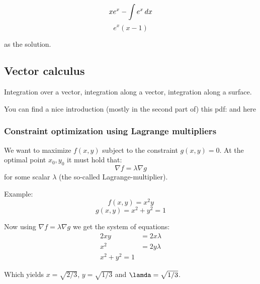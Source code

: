 $$ xe^x - \int e^x \mathop{dx} $$
$$ e^x ( x - 1) $$

as the solution. 

\subsection{Vector calculus}

Integration over a vector, integration along a vector, integration along a surface. 

You can find a nice introduction (mostly in the second part of) this pdf:  and here 


\subsubsection{Constraint optimization using Lagrange multipliers}

We want to maximize $f(x, y)$ subject to the constraint $g(x, y) = 0$.
At the optimal point $x_0, y_0$ it must hold that:
\begin{equation}
  \nabla f = \lambda \nabla g
\end{equation}
for some scalar $\lambda$ (the so-called Lagrange-multiplier).

Example:
$$ f(x, y) = x^2 y $$
$$ g(x, y) = x^2 + y^2 = 1 $$

Now using $\nabla f = \lambda \nabla g$ we get the system of equations:
\begin{equation}
    \begin{aligned}
        2xy &= 2x\lambda \\
        x^2 &= 2y\lambda \\
        x^2 + y^2 = 1
    \end{aligned}
\end{equation}

Which yields $x = \sqrt{2/3}$, $y = \sqrt{1/3}$ and $\lamda = \sqrt{1/3}$.
